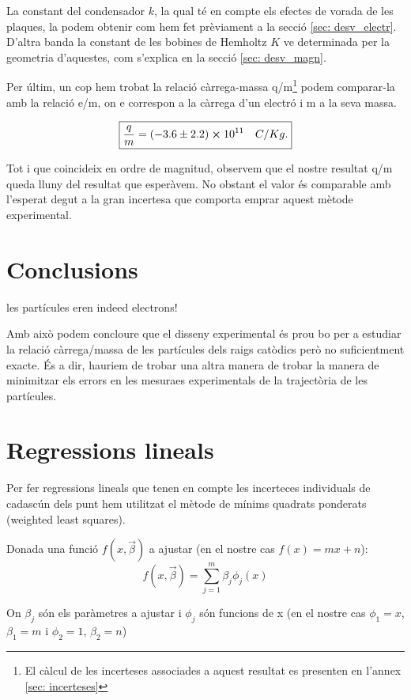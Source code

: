 \documentclass[11pt]{article}
\begin{document}
La constant del condensador $k$, la qual té en compte els efectes de vorada de les plaques, la podem obtenir com hem fet prèviament a la secció \ref{sec: desv_electr}. D'altra banda la constant de les bobines de Hemholtz $K$ ve determinada per la geometria d'aquestes, com s'explica en la secció \ref{sec: desv_magn}.

Per últim, un cop hem trobat la relació càrrega-massa q/m\footnote{El càlcul de les incerteses associades a aquest resultat es presenten en l'annex \ref{sec: incerteses}} podem comparar-la amb la relació e/m, on e correspon a la càrrega d'un electró i m a la seva massa.

\[
\boxed{\frac{q}{m}=(-3.6\pm2.2)\cross10^{11}\quad C/Kg.}
\] 

Tot i que coincideix en ordre de magnitud, observem que el nostre resultat q/m queda lluny del resultat que esperàvem. No obstant el valor és comparable amb l'esperat degut a la gran incertesa que comporta emprar aquest mètode experimental. 

\section{Conclusions}
les partícules eren indeed electrons!

Amb això podem concloure que el disseny experimental és prou bo per a estudiar la relació càrrega/massa de les partícules dels raigs catòdics però no suficientment exacte. És a dir, hauriem de trobar una altra manera de trobar la manera de minimitzar els errors en les mesuraes experimentals de la trajectòria de les partícules.

\newpage

\section{Regressions lineals}\label{sec: Regr.lineal}
Per fer regressions lineals que tenen en compte les incerteces individuals de cadascún dels punt hem utilitzat el mètode de mínims quadrats ponderats (weighted least squares).

Donada una funció $f(x,\vec{\beta})$ a ajustar (en el nostre cas $f(x) = mx+n$):
\begin{equation}
    f(x,\vec{\beta}) = \sum_{j=1}^m\beta_j\phi_j(x)
\end{equation}

 On ${\beta_j}$ són els paràmetres a ajustar i $\phi_j$ són funcions de x (en el nostre cas $\phi_1 = x$, $\beta_1 = m$ i $\phi_2 = 1$, $\beta_2 = n$)
\end{document}
